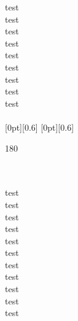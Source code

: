 \documentclass[17pt,a4paper]{extarticle}
\begin{document}
\noindent
test\\
test\\
test\\
test\\
test\\
test\\
test\\
test\\
test\\
\\
\raisebox{-0.5ex}[0pt][0.6\baselineskip]{}
\dotfill 
\raisebox {0.9ex}[0pt][0.6\baselineskip]{\begin{turn}{180} \end{turn}}
\\
\\
\noindent
test\\
test\\
test\\
test\\
test\\
test\\
test\\
test\\
test\\
test\\
test\\
\end{document}
